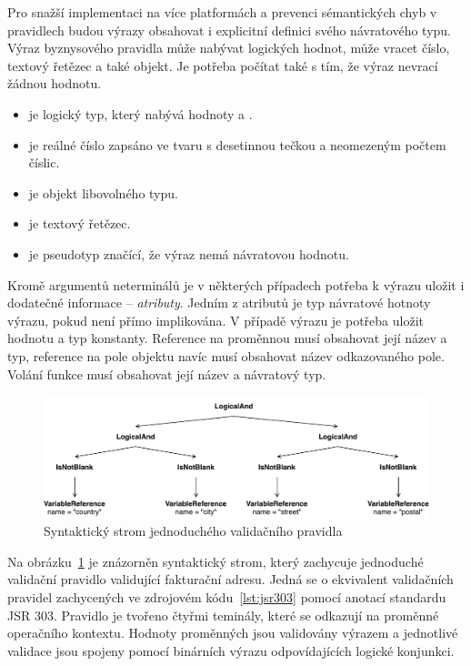 Pro snažší implementaci na více platformách a prevenci sémantických chyb v pravidlech budou výrazy
obsahovat i explicitní definici svého návratového typu. Výraz byznysového pravidla může nabývat logických hodnot,
může vracet číslo, textový řetězec a také objekt. Je potřeba počítat také s tím, že výraz nevrací žádnou
hodnotu.

\begin{itemize}
    \item {} je logický typ, který nabývá hodnoty  a .
    \item {} je reálné číslo zapsáno ve tvaru s desetinnou tečkou a neomezeným počtem číslic.
    \item {} je objekt libovolného typu.
    \item {} je textový řetězec.
    \item {} je pseudotyp značící, že výraz nemá návratovou hodnotu.
\end{itemize}

Kromě argumentů neterminálů je v některých případech potřeba k výrazu uložit i dodatečné informace --
\textit{atributy}. Jedním z atributů je typ návratové hotnoty výrazu, pokud není přímo implikována.
V případě výrazu  je potřeba uložit hodnotu a typ konstanty. Reference na proměnnou
musí obsahovat její název a typ, reference na pole objektu navíc musí obsahovat název odkazovaného pole.
Volání funkce musí obsahovat její název a návratový typ.

\begin{figure}
    \centering
    \includegraphics[keepaspectratio=true, width=1\linewidth]{figures/simple-rule.pdf}
    \caption{Syntaktický strom jednoduchého validačního pravidla}
    \label{fig:simple-rule}
\end{figure}

Na obrázku~\ref{fig:simple-rule} je znázorněn syntaktický strom, který zachycuje jednoduché
validační pravidlo validující fakturační adresu. Jedná se o ekvivalent validačních pravidel
zachycených ve zdrojovém kódu~\ref{lst:jsr303} pomocí anotací standardu \gls{JSR} 303.
Pravidlo je tvořeno čtyřmi teminály, které se odkazují na proměnné operačního kontextu.
Hodnoty proměnných jsou validovány výrazem  a jednotlivé validace
jsou spojeny pomocí binárních výrazu  odpovídajících logické konjunkci.

